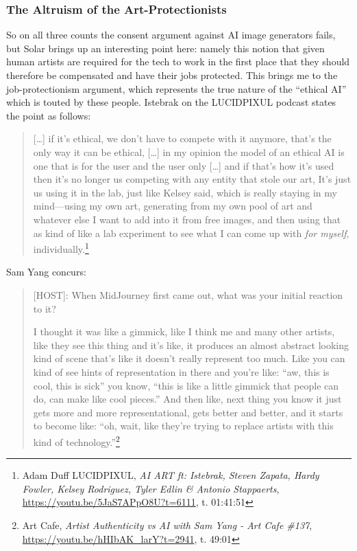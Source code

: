 \documentclass[11pt]{article}
\begin{document}
\subsubsection*{The Altruism of the Art-Protectionists}
\label{sec:orgbd271d6}
So on all three counts the consent argument against AI image generators fails, but Solar brings up an interesting point here: namely this notion that given human artists are required for the tech to work in the first place that they should therefore be compensated and have their jobs protected. This brings me to the job-protectionism argument, which represents the true nature of the ``ethical AI'' which is touted by these people. Istebrak on the LUCIDPIXUL podcast states the point as follows:
\begin{quote}
[\ldots{}] if it's ethical, we don't have to compete with it anymore, that's the only way it can be ethical, [\ldots{}] in my opinion the model of an ethical AI is one that is for the user and the user only [\ldots{}] and if that's how it's used then it's no longer us competing with any entity that stole our art, It's just us using it in the lab, just like Kelsey said, which is really staying in my mind---using my own art, generating from my own pool of art and whatever else I want to add into it from free images, and then using that as kind of like a lab experiment to see what I can come up with \emph{for myself}, individually.\footnote{Adam Duff LUCIDPIXUL, \emph{AI ART ft: Istebrak, Steven Zapata, Hardy Fowler, Kelsey Rodriguez, Tyler Edlin \& Antonio Stappaerts}, \url{https://youtu.be/5JaS7APpO8U?t=6111}, t. 01:41:51}
\end{quote}

Sam Yang concurs:
\begin{quote}
[HOST]: When MidJourney first came out, what was your initial reaction to it?

I thought it was like a gimmick, like I think me and many other artists, like they see this thing and it's like, it produces an almost abstract looking kind of scene that's like it doesn't really represent too much. Like you can kind of see hints of representation in there and you're like: ``aw, this is cool, this is sick'' you know, ``this is like a little gimmick that people can do, can make like cool pieces.'' And then like, next thing you know it just gets more and more representational, gets better and better, and it starts to become like: ``oh, wait, like they're trying to replace artists with this kind of technology.''\footnote{Art Cafe, \emph{Artist Authenticity vs AI with Sam Yang - Art Cafe \#137}, \url{https://youtu.be/hHIbAK\_larY?t=2941}, t. 49:01}
\end{quote}
\end{document}
